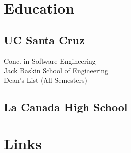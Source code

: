 \documentclass[letterpaper]{deedy-resume} %
\begin{document}




\begin{minipage}[t]{0.33\textwidth} %


\section{Education} 

\subsection{UC Santa Cruz }

Conc. in Software Engineering \\
Jack Baskin School of Engineering \\
Dean's List (All Semesters) \\

\sectionspace %


\subsection{La Canada High School}


\sectionspace %

\iffalse
\section{Links} 


\end{minipage}
\end{document}
